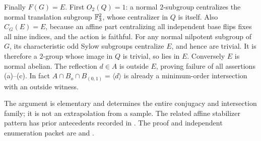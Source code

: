 Finally \(F(G)=E\).
First \(O_2(Q)=1\): a normal \(2\)-subgroup centralizes the normal
translation subgroup \(\mathbb F_3^2\), whose centralizer in \(Q\) is itself.
Also \(C_G(E)=E\), because an affine part centralizing all independent
base flips fixes all nine indices, and the action is faithful.
For any normal nilpotent subgroup of \(G\), its characteristic odd
Sylow subgroups centralize \(E\), and hence are trivial.
It is therefore a \(2\)-group whose image in \(Q\) is trivial,
so lies in \(E\). Conversely \(E\) is normal abelian.
The reflection \(d\in A\) is outside \(E\), proving failure of all
assertions (a)--(c). In fact
\(A\cap B_o\cap B_{(0,1)}=\langle d\rangle\) is already a
minimum-order intersection with an outside witness.

The argument is elementary and determines the entire conjugacy and
intersection family; it is not an extrapolation from a sample.
The related affine stabilizer pattern has prior antecedents recorded
in .
The proof and independent enumeration packet are
 and
.

